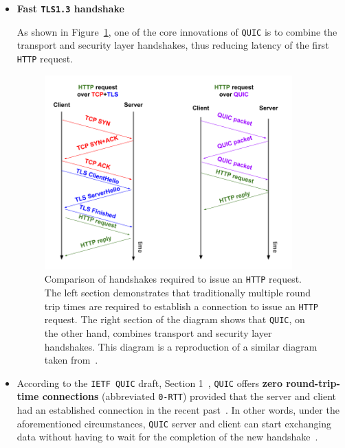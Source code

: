 \documentclass[12pt,a4paper]{report}
\begin{document}
\begin{itemize}
\item \textbf{Fast \texttt{TLS1.3} handshake}

As shown in Figure~\ref{fig:QUIC_handshake_vs_TCP-TLS_handshake}, one of the core innovations of \texttt{QUIC} is to combine the transport and security layer handshakes, thus reducing latency of the first \texttt{HTTP} request.


     \begin{figure}[H]
    \centering
    \includegraphics[width=0.9\textwidth]{figs/QUIC_handshake_vs_TCP-TLS_handshake.png}
    \caption[Comparison of handshakes required to issue an \texttt{HTTP} request]{Comparison of handshakes required to issue an \texttt{HTTP} request. The left section demonstrates that traditionally multiple round trip times are required to establish a connection to issue an \texttt{HTTP} request. The right section of the diagram shows that \texttt{QUIC}, on the other hand, combines transport and security layer handshakes. This diagram is a reproduction of a similar diagram taken from~\cite{the-road-to-quic}.}
    \label{fig:QUIC_handshake_vs_TCP-TLS_handshake}
    \end{figure}
 
 

  \item 
    According to the \texttt{IETF QUIC} draft, Section 1~\cite{ietf-quic-transport-draft-32}, \texttt{QUIC} offers \textbf{zero round-trip-time connections} (abbreviated \texttt{0-RTT}) provided that the server and client had an established connection in the recent past~\cite{introducing-0-rtt}.
    In other words, under the aforementioned circumstances, \texttt{QUIC} server and client can start exchanging data without having to wait for the completion of the new handshake~\cite{ietf-quic-transport-draft-32}.
  

\end{itemize}
\end{document}
